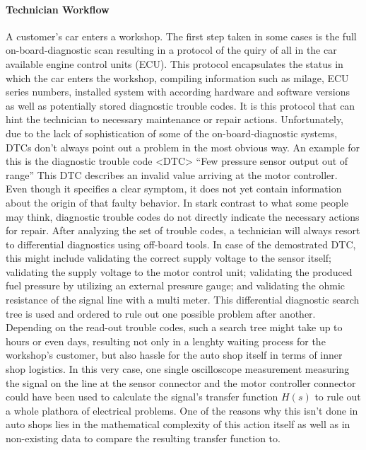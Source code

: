 \paragraph{Technician Workflow}
A customer's car enters a workshop. 
The first step taken in some cases is the full on-board-diagnostic scan resulting in a protocol of the quiry of all in the car available engine control units (ECU). 
This protocol encapsulates the status in which the car enters the workshop, compiling information such as milage, ECU series numbers, installed system with according hardware and software versions as well as potentially stored diagnostic trouble codes.
It is this protocol that can hint the technician to necessary maintenance or repair actions.
Unfortunately, due to the lack of sophistication of some of the on-board-diagnostic systems, DTCs don't always point out a problem in the most obvious way. 
An example for this is the diagnostic trouble code <DTC>
``Few pressure sensor output out of range'' This DTC describes an invalid value arriving at the motor controller.
Even though it specifies a clear symptom, it does not yet contain information about the origin of that faulty behavior.
In stark contrast to what some people may think, diagnostic trouble codes do not directly indicate the necessary actions for repair.
After analyzing the set of trouble codes, a technician will always resort to differential diagnostics using off-board tools.
In case of the demostrated DTC, this might include validating the correct supply voltage to the sensor itself; 
validating the supply voltage to the motor control unit; validating the produced fuel pressure by utilizing an external pressure gauge; and validating the ohmic resistance of the signal line with a multi meter.
This differential diagnostic search tree is used and ordered to rule out one possible problem after another.
Depending on the read-out trouble codes, such a search tree might take up to hours or even days, resulting not only in a lenghty waiting process for the workshop's customer, but also hassle for the auto shop itself in terms of inner shop logistics.
In this very case, one single oscilloscope measurement measuring the signal on the line at the sensor connector and the motor controller connector could have been used to calculate the signal's transfer function $H(s)$ to rule out a whole plathora of electrical problems.
One of the reasons why this isn't done in auto shops lies in the mathematical complexity of this action itself as well as in non-existing data to compare the resulting transfer function to.
